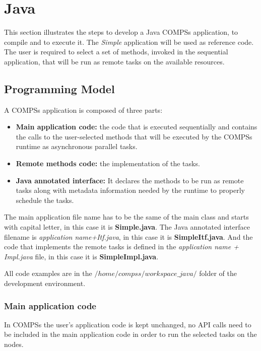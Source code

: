 \section{Java}
\label{sec:Java}

This section illustrates the steps to develop a Java COMPSs application, to compile and to execute it. The \textit{Simple} application will be used as reference code. 
The user is required to select a set of methods, invoked in the sequential application, that will be run as remote tasks on the available resources.

\subsection{Programming Model}
A COMPSs application is composed of three parts:
\begin{itemize}
 \item \textbf{Main application code:} the code that is executed sequentially and contains the calls to the user-selected methods 
 that will be executed by the COMPSs runtime as asynchronous parallel tasks.
 \item \textbf{Remote methods code:} the implementation of the tasks.
 \item \textbf{Java annotated interface:} It declares the methods to be run as remote tasks along with metadata information needed by the runtime to properly schedule the tasks.
\end{itemize}

The main application file name has to be the same of the main class and starts with capital
letter, in this case it is \textbf{Simple.java}. The Java annotated interface filename is \textit{application name+Itf.java}, in this case it is \textbf{SimpleItf.java}. And the code that implements the remote tasks is defined in the \textit{application name + Impl.java} file, in this case it is \textbf{SimpleImpl.java}.

All code examples are in the $/home/compss/workspace\_java/$ folder of the development environment.


\subsubsection{Main application code}

In COMPSs the user's application code is kept unchanged, no API calls need to be included in the main
application code in order to run the selected tasks on the nodes.

